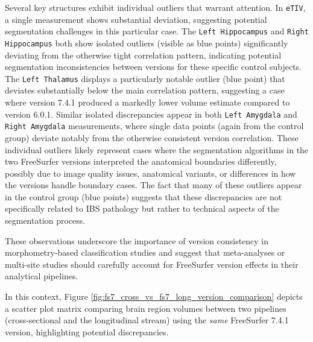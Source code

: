 \documentclass[diagnostics,article,accept,pdftex,moreauthors]{Definitions/mdpi}
\begin{document}
Several key structures exhibit individual outliers that warrant attention. In \texttt{eTIV}, a single measurement shows substantial deviation, suggesting potential segmentation challenges in this particular case. The \texttt{Left Hippocampus} and \texttt{Right Hippocampus} both show isolated outliers (visible as blue points) significantly deviating from the otherwise tight correlation pattern, indicating potential segmentation inconsistencies between versions for these specific control subjects. The \texttt{Left Thalamus} displays a particularly notable outlier (blue point) that deviates substantially below the main correlation pattern, suggesting a case where version 7.4.1 produced a markedly lower volume estimate compared to version 6.0.1. Similar isolated discrepancies appear in both \texttt{Left Amygdala} and \texttt{Right Amygdala} measurements, where single data points (again from the control group) deviate notably from the otherwise consistent version correlation. These individual outliers likely represent cases where the segmentation algorithms in the two FreeSurfer versions interpreted the anatomical boundaries differently, possibly due to image quality issues, anatomical variants, or differences in how the versions handle boundary cases. The fact that many of these outliers appear in the control group (blue points) suggests that these discrepancies are not specifically related to IBS pathology but rather to technical aspects of the segmentation process.

These observations underscore the importance of version consistency in morphometry-based classification studies and suggest that meta-analyses or multi-site studies should carefully account for FreeSurfer version effects in their analytical pipelines.




In this context, Figure \ref{fig:fs7_cross_vs_fs7_long_version_comparison} depicts a scatter plot matrix comparing brain region volumes between two pipelines (cross-sectional and the longitudinal stream) using the \textit{same} FreeSurfer 7.4.1 version, highlighting potential discrepancies.
\end{document}
